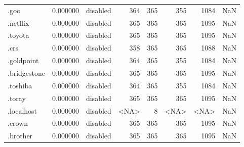 \begin{tabular}{lrlrrrrl}
.goo                      &          0.000000 &        disabled &                         364 &                         365 &                         355 &                1084 &                  NaN \\
.netflix                  &          0.000000 &        disabled &                         365 &                         365 &                         365 &                1095 &                  NaN \\
.toyota                   &          0.000000 &        disabled &                         365 &                         365 &                         365 &                1095 &                  NaN \\
.crs                      &          0.000000 &        disabled &                         358 &                         365 &                         365 &                1088 &                  NaN \\
.goldpoint                &          0.000000 &        disabled &                         364 &                         365 &                         355 &                1084 &                  NaN \\
.bridgestone              &          0.000000 &        disabled &                         365 &                         365 &                         365 &                1095 &                  NaN \\
.toshiba                  &          0.000000 &        disabled &                         364 &                         365 &                         355 &                1084 &                  NaN \\
.toray                    &          0.000000 &        disabled &                         365 &                         365 &                         365 &                1095 &                  NaN \\
.localhost                &          0.000000 &        disabled &                        <NA> &                           8 &                        <NA> &                <NA> &                  NaN \\
.crown                    &          0.000000 &        disabled &                         365 &                         365 &                         365 &                1095 &                  NaN \\
.brother                  &          0.000000 &        disabled &                         365 &                         365 &                         365 &                1095 &                  NaN \\

\end{tabular}
